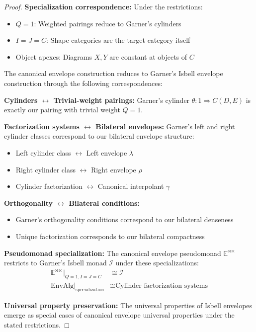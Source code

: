 \documentclass[11pt]{article}
\theoremstyle{plain}
\theoremstyle{definition}
\theoremstyle{remark}
\newcommand{\EnvAlg}{\mathrm{EnvAlg}}
\begin{document}
\begin{proof}
\textbf{Specialization correspondence:} Under the restrictions:
\begin{itemize}
\item $Q = 1$: Weighted pairings reduce to Garner's cylinders
\item $I = J = C$: Shape categories are the target category itself
\item Object apexes: Diagrams $X, Y$ are constant at objects of $C$
\end{itemize}

The canonical envelope construction reduces to Garner's Isbell envelope construction through the following correspondences:

\textbf{Cylinders $\leftrightarrow$ Trivial-weight pairings:} Garner's cylinder $\theta : 1 \Rightarrow C(D, E)$ is exactly our pairing with trivial weight $Q = 1$.

\textbf{Factorization systems $\leftrightarrow$ Bilateral envelopes:} Garner's left and right cylinder classes correspond to our bilateral envelope structure:
\begin{itemize}
\item Left cylinder class $\leftrightarrow$ Left envelope $\lambda$
\item Right cylinder class $\leftrightarrow$ Right envelope $\rho$  
\item Cylinder factorization $\leftrightarrow$ Canonical interpolant $\gamma$
\end{itemize}

\textbf{Orthogonality $\leftrightarrow$ Bilateral conditions:}
\begin{itemize}
\item Garner's orthogonality conditions correspond to our bilateral denseness
\item Unique factorization corresponds to our bilateral compactness
\end{itemize}

\textbf{Pseudomonad specialization:} The canonical envelope pseudomonad $\mathbb{E}^{\rtimes \ltimes}$ restricts to Garner's Isbell monad $\mathcal{I}$ under these specializations:
\begin{align}
\mathbb{E}^{\rtimes \ltimes}|_{Q=1,I=J=C} &\cong \mathcal{I} \\
\EnvAlg|_{\text{specialization}} &\cong \text{Cylinder factorization systems}
\end{align}

\textbf{Universal property preservation:} The universal properties of Isbell envelopes emerge as special cases of canonical envelope universal properties under the stated restrictions.
\end{proof}
\end{document}

